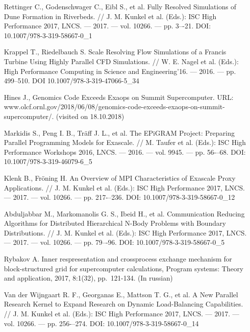 \documentclass[
11pt,%
tightenlines,%
twoside,%
onecolumn,%
nofloats,%
nobibnotes,%
nofootinbib,%
superscriptaddress,%
noshowpacs,%
centertags]%
{revtex4}
\begin{document}
\begin{thebibliography}{99}




Rettinger C., Godenschwager C., Eibl S., et al. Fully Resolved Simulations of Dune Formation in Riverbeds. // J. M. Kunkel et al. (Eds.): ISC High Performance 2017, LNCS. — 2017. — vol. 10266. — pp. 3–-21. DOI: 10.1007/978-3-319-58667-0\_1

Krappel T., Riedelbauch S. Scale Resolving Flow Simulations of a Francis Turbine Using Highly Parallel CFD Simulations. // W. E. Nagel et al. (Eds.): High Performance Computing in Science and Engineering'16. — 2016. — pp. 499--510. DOI 10.1007/978-3-319-47066-5\_34

Hines J., Genomics Code Exceeds Exaops on Summit Supercomputer. URL: www.olcf.ornl.gov/2018/06/08/genomics-code-exceeds-exaops-on-summit-supercomputer/. (visited on 18.10.2018)

Markidis S., Peng I. B., Tr\"aff J. L., et al. The EPiGRAM Project: Preparing Parallel Programming Models for Exascale. // M. Taufer et al. (Eds.): ISC High Performance Workshops 2016, LNCS. — 2016. — vol. 9945. — pp. 56-–68. DOI: 10.1007/978-3-319-46079-6\_5

Klenk B., Fröning H. An Overview of MPI Characteristics of Exascale Proxy Applications. // J. M. Kunkel et al. (Eds.): ISC High Performance 2017, LNCS. — 2017. — vol. 10266. — pp. 217-–236. DOI: 10.1007/978-3-319-58667-0\_12

Abduljabbar M., Markomanolis G. S., Ibeid H., et al. Communication Reducing Algorithms for Distributed Hierarchical N-Body Problems with Boundary Distributions. // J. M. Kunkel et al. (Eds.): ISC High Performance 2017, LNCS. — 2017. — vol. 10266. — pp. 79–-96. DOI: 10.1007/978-3-319-58667-0\_5

Rybakov A. Inner respresentation and crossprocess exchange mechanism for block-structured grid for supercomputer calculations, Program systems: Theory and application, 2017, 8:1(32), pp.~121-134. (In russian)

Van der Wijngaart R. F., Georganas E., Mattson T. G., et al. A New Parallel Research Kernel to Expand Research on Dynamic Load-Balancing Capabilities. // J. M. Kunkel et al. (Eds.): ISC High Performance 2017, LNCS. — 2017. — vol. 10266. — pp. 256-–274. DOI: 10.1007/978-3-319-58667-0\_14


\end{thebibliography}
\end{document}
